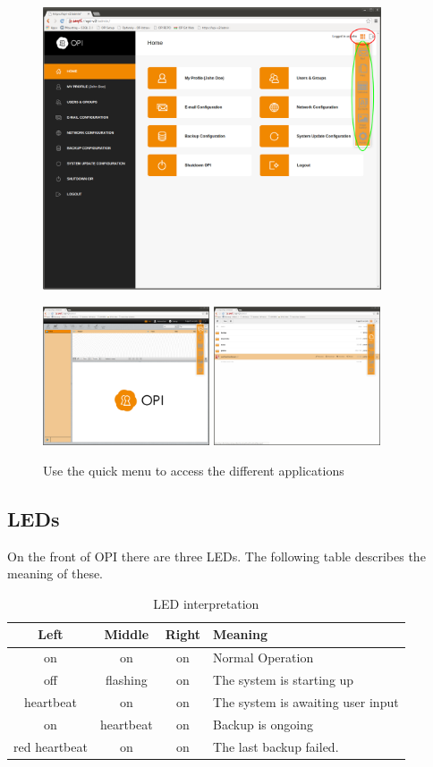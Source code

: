 \documentclass[12pt,a4paper,titlepage]{article}
\begin{document}
\begin{figure}[h!]
\centering
\includegraphics[width=10cm]{./img/menu-admin}

\includegraphics[width=4.93cm]{./img/menu-mail}
\includegraphics[width=4.93cm]{./img/menu-files}
\caption{Use the quick menu to access the different applications}
\end{figure}

\newpage
\subsection{LEDs}
On the front of OPI there are three LEDs.
The following table describes the meaning of these.
\begin{table}[h!]
\centering
\renewcommand{\arraystretch}{1.5}
\renewcommand{\tabcolsep}{0.2cm}
\begin{tabular}{|c|c|c|l|}
\hline
\textbf{Left}&\textbf{Middle}&\textbf{Right}&\textbf{Meaning} \\
\hline
on & on & on & Normal Operation \\
\hline
off & flashing & on & The system is starting up \\
\hline
heartbeat & on & on & The system is awaiting user input\\
\hline
on & heartbeat & on & Backup is ongoing \\
\hline
red heartbeat & on & on & The last backup failed. \\
\hline
\end{tabular}
\caption{LED interpretation}
\end{table}
\end{document}
